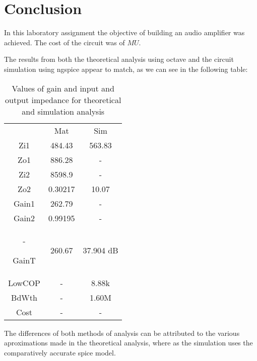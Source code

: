 \section{Conclusion}
\label{sec:conclusion}

In this laboratory assignment the objective of building an audio amplifier was achieved.
 The cost of the circuit was of $ MU$.
 
The results from both the theoretical analysis using octave and the circuit
simulation using ngspice appear to match, as we can see in the following table:

\begin{table}[H]
\addtolength{\tabcolsep}{-4pt}
\caption{Values of gain and input and output impedance for theoretical and simulation analysis}
\vspace{-3mm}
\begin{tabular}{|c|c|c|}
\hline
 &	Mat &	Sim\\

Zi1 &484.43&	563.83\\

Zo1&886.28	&-\\

Zi2&	8598.9	&-\\

Zo2&	0.30217&	10.07\\

Gain1&	262.79	&-\\

Gain2&	0.99195&-\\	-

GainT&	260.67	&37.904 dB\\

LowCOP&	-&	8.88k\\

BdWth	&-	&1.60M\\

Cost	&-&	-\\
\hline
\end{tabular}
\label{tab:Comparison}
\end{table}


The differences of both methods of analysis can be attributed to the various aproximations
made in the theoretical analysis, where as the simulation uses the comparatively accurate spice model.